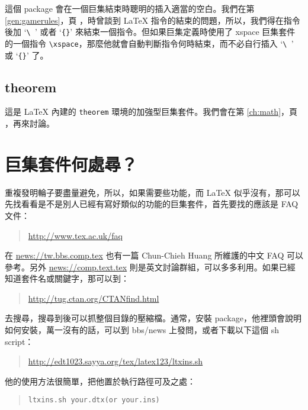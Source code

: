 這個 package 會在一個巨集結束時聰明的插入適當的空白。我們在第 \ref{gen:gamerules}，頁 \pageref{gen:gamerules}，時曾談到 \LaTeX{} 指令的結束的問題，所以，我們得在指令後加 `\verb|\ |' 或者 `\verb|{}|' 來結束一個指令。但如果巨集定義時使用了 \textsf{xspace} 巨集套件的一個指令 \verb|\xspace|，那麼他就會自動判斷指令何時結束，而不必自行插入 `\verb|\ |' 或 `\verb|{}|' 了。

\subsection{theorem}

這是 \LaTeX{} 內建的 \texttt{theorem} 環境的加強型巨集套件。我們會在第 \ref{ch:math}，頁 \pageref{ch:math}，再來討論。


\section{巨集套件何處尋？}
\label{sec:pkgwhere}

重複發明輪子要盡量避免，所以，如果需要些功能，而 \LaTeX{} 似乎沒有，那可以先找看看是不是別人已經有寫好類似的功能的巨集套件，首先要找的應該是 FAQ 文件：

\begin{quote}
  \url{http://www.tex.ac.uk/faq}
\end{quote}

在 \url{news://tw.bbs.comp.tex} 也有一篇 Chun-Chieh Huang 所維護的中文 FAQ 可以參考。另外 \url{news://comp.text.tex} 則是英文討論群組，可以多多利用。如果已經知道套件名或關鍵字，那可以到：

\begin{quote}
  \url{http://tug.ctan.org/CTANfind.html}
\end{quote}

去搜尋，搜尋到後可以抓整個目錄的壓縮檔。通常，安裝 package，他裡頭會說明如何安裝，萬一沒有的話，可以到 bbs/news 上發問，或者下載以下這個 sh script：

\begin{quote}
  \url{http://edt1023.sayya.org/tex/latex123/ltxins.sh}
\end{quote}

他的使用方法很簡單，把他置於執行路徑可及之處：

\begin{quote}
  \begin{verbatim}
ltxins.sh your.dtx(or your.ins)
\end{verbatim}
\end{quote}

